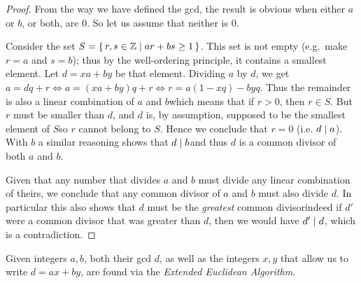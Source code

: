   \begin{proof}
    From the way we have defined the gcd, the result is obvious when either $a$ or $b$, or both, are $0$. So let us assume that neither is $0$. 

    Consider the set $S=\set{r, s \in \mathbb{Z} | ar+bs \ge 1}$. This set is not empty (e.g.\ make $r=a$ and $s=b$); thus by the well-ordering principle, it contains a smallest element. Let $d=xa+by$ be that element. Dividing $a$ by $d$, we get $a = dq+r \Leftrightarrow a = (xa+by)q+r \Leftrightarrow r = a(1-xq) - byq$. Thus the remainder is also a linear combination of $a$ and $b$\emd which means that if $r > 0$, then $r \in S$. But $r$ must be smaller than $d$, and $d$ is, by assumption, supposed to be the smallest element of $S$\emd so $r$ cannot belong to $S$. Hence we conclude that $r = 0$ (i.e. $d\mathrel{|} a$). With $b$ a similar reasoning shows that $d\mathrel{|} b$\emd and thus $d$ is a common divisor of both $a$ and $b$.

    Given that any number that divides $a$ and $b$ must divide any linear combination of theirs, we conclude that any common divisor of $a$ and $b$ must also divide $d$. In particular this also shows that $d$ must be the \emph{greatest} common divisor\emd indeed if $d'$ were a common divisor that was greater than $d$, then we would have $d'\mathrel{|} d$, which is a contradiction.
  \end{proof}

  \begin{remark}
    \label{rem:eea}
    Given integers $a, b$, both their gcd $d$, as well as the integers $x, y$ that allow us to write $d = ax + by$, are found via the \emph{Extended Euclidean Algorithm}.
  \end{remark}

